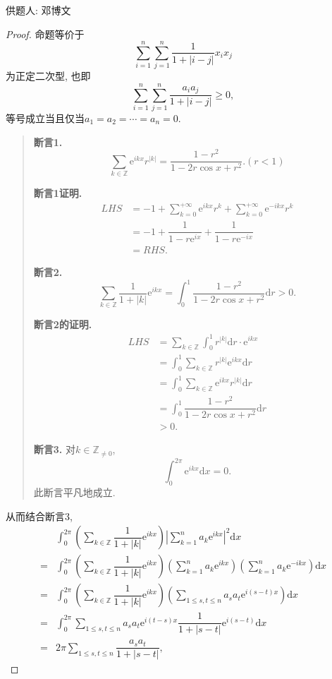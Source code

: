 \documentclass[lang=cn,12pt,a4paper]{elegantpaper.cls}
\begin{document}
\begin{enumerate}
	\begin{flushright}
		\kaishu
		供题人: 邓博文
	\end{flushright}
	
	\begin{proof}
		命题等价于\[\sum_{i=1}^{n}\sum_{j=1}^{n}\dfrac{1}{1+|i-j|}x_ix_j\]为正定二次型, 也即\[\sum_{i=1}^{n}\sum_{j=1}^{n}\dfrac{a_ia_j}{1+|i-j|}\geq 0,\]等号成立当且仅当$a_1=a_2=\cdots=a_n=0$.
		
		\begin{quote}
			\textbf{断言1.} \[\sum_{k\in\mathbb Z}\mathrm e^{ikx}r^{|k|}=\dfrac{1-r^2}{1-2r\cos x+r^2}.(r<1)\]
		
		\textbf{断言1证明.} \[\begin{aligned}
			LHS&=-1+\sum_{k=0}^{+\infty}\mathrm e^{ikx}r^{k}+\sum_{k=0}^{+\infty}\mathrm e^{-ikx}r^{k}\\&=-1+\dfrac{1}{1-r\mathrm e^{ix}}+\dfrac{1}{1-r\mathrm e^{-ix}}\\&=RHS.
		\end{aligned}\]
		
		\textbf{断言2.} \[\sum_{k\in\mathbb Z}\dfrac{1}{1+|k|}\mathrm e^{ikx}=\int_{0}^{1}\dfrac{1-r^2}{1-2r\cos x+r^2}\mathrm dr>0.\]
		
		\textbf{断言2的证明.} \[\begin{aligned}
			LHS&=\sum_{k\in\mathbb Z}\int_{0}^{1}r^{|k|}\mathrm dr\cdot\mathrm e^{ikx}\\
			&=\int_{0}^{1}\sum_{k\in\mathbb Z}r^{|k|}\mathrm e^{ikx}\mathrm dr\\
			&=\int_{0}^{1}\sum_{k\in\mathbb Z}\mathrm e^{ikx}r^{|k|}\mathrm dr\\
			&=\int_{0}^{1}\dfrac{1-r^2}{1-2r\cos x+r^2}\mathrm dr\\
			&>0.
		\end{aligned}\]
		
		\textbf{断言3.} 对$k\in\mathbb Z_{\neq 0}$, \[\int_{0}^{2\pi}\mathrm e^{ikx}\mathrm dx=0.\]此断言平凡地成立.
		
		\end{quote}
		
		从而结合断言3, \[
		\begin{aligned}
			&\int_{0}^{2\pi}\left(\sum_{k\in\mathbb Z}\dfrac{1}{1+|k|}\mathrm e^{ikx}\right)\left|\sum_{k=1}^{n}a_k\mathrm e^{ikx}\right|^2\mathrm dx\\
			=&\int_{0}^{2\pi}\left(\sum_{k\in\mathbb Z}\dfrac{1}{1+|k|}\mathrm e^{ikx}\right)\left(\sum_{k=1}^{n}a_k\mathrm e^{ikx}\right)\left(\sum_{k=1}^{n}a_k\mathrm e^{-ikx}\right)\mathrm dx\\
			=&\int_{0}^{2\pi}\left(\sum_{k\in\mathbb Z}\dfrac{1}{1+|k|}\mathrm e^{ikx}\right)\left(\sum_{1\leq s,t\leq n}a_sa_t\mathrm e^{i(s-t)x}\right)\mathrm dx\\
			=&\int_{0}^{2\pi}\sum_{1\leq s,t\leq n}a_sa_t\mathrm e^{i(t-s)x}\dfrac{1}{1+|s-t|}\mathrm e^{i(s-t)}\mathrm dx\\
			=&2\pi\sum_{1\leq s,t\leq n}\dfrac{a_sa_t}{1+|s-t|},
		\end{aligned}
		\]
		

\end{proof}
\end{enumerate}
\end{document}
